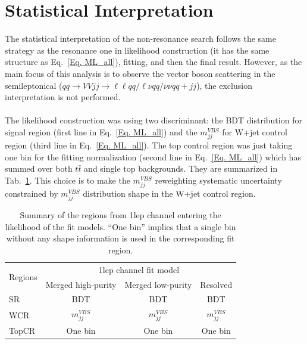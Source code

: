 \section{Statistical Interpretation}
The statistical interpretation of the non-resonance search follows the same strategy as the resonance one in likelihood construction (it has the same structure as Eq.~\ref{Eq. ML_all}), fitting, and then the final result. However, as the main focus of this analysis is to observe the vector boson scattering in the semileptonical ($qq\to VVjj \to \ell\ell qq/\ell\nu qq/\nu\nu qq +jj$), the exclusion interpretation is not performed. 
\\
\\The likelihood construction was using two discriminant: the BDT distribution for signal region (first line in Eq.~\ref{Eq. ML_all}) and the $m^{VBS}_{jj}$ for W+jet control region (third line in Eq.~\ref{Eq. ML_all}). The top control region was just taking one bin for the fitting normalization (second line in Eq.~\ref{Eq. ML_all}) which has summed over both $t\bar{t}$ and single top backgrounds. They are summarized in Tab.~\ref{tab:fitregions_1lep}. This choice is to make the $m^{VBS}_{jj}$ reweighting systematic uncertainty constrained by $m^{VBS}_{jj}$ distribution shape in the W+jet control region. 
\begin{table}[htb!]
	\centering
	\begin{tabular}{lccc}
		\toprule\midrule
		\multirow{2}{*}{Regions} & \multicolumn{3}{c}{1lep channel fit model} \\
		\cmidrule{2-4}
		& Merged high-purity & Merged low-purity & Resolved \\
		\midrule
		SR     & BDT & BDT & BDT \\
		WCR    & $m^{VBS}_{jj}$& $m^{VBS}_{jj}$ & $m^{VBS}_{jj}$ \\
		TopCR  & One bin & One bin & One bin \\
		\midrule
		\bottomrule
	\end{tabular}
	\caption{\label{tab:fitregions_1lep} Summary of the regions from 1lep channel entering the likelihood of the fit models. 
		``One bin'' implies that a single bin without any shape information is used in the corresponding fit region.}
\end{table}

